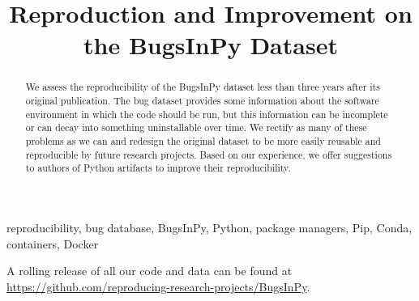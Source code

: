\documentclass[conference]{IEEEtran}
\begin{document}
\title{Reproduction and Improvement on the BugsInPy Dataset}

\author{
\and  
{}
\and
{}
}

\maketitle

\begin{abstract}
  We assess the reproducibility of the BugsInPy dataset less than three years after its original publication.
  The bug dataset provides some information about the software environment in which the code should be run, but this information can be incomplete or can decay into something uninstallable over time.
  We rectify as many of these problems as we can and redesign the original dataset to be more easily reusable and reproducible by future research projects.
  Based on our experience, we offer suggestions to authors of Python artifacts to improve their reproducibility.
\end{abstract}

\begin{IEEEkeywords}
reproducibility, bug database, BugsInPy, Python, package managers, Pip, Conda, containers, Docker
\end{IEEEkeywords}




\printbibliography


A rolling release of all our code and data can be found at \url{https://github.com/reproducing-research-projects/BugsInPy}.
\end{document}

